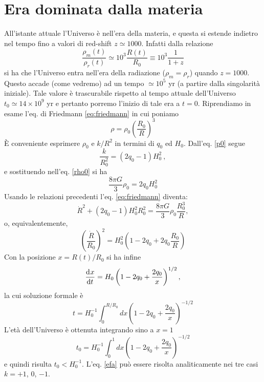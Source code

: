\section{Era dominata dalla materia}

All'istante attuale l'Universo è nell'era della materia, e questa si estende
indietro nel tempo fino a valori di red-shift $z \simeq 1000$.  Infatti dalla
relazione
\begin{equation}
  \frac {\rho_m(t)} {\rho_r(t)} \simeq  10^{3} \frac {R(t)} {R_0} \equiv  10^3
  \frac{1}{1+z}
\end{equation}
si ha che l'Universo entra nell'era della radiazione ($\rho_m = \rho_r$) quando
$z = 1000$.  Questo accade (come vedremo) ad un tempo $ \simeq 10^5$ yr (a
partire dalla singolarità iniziale).  Tale valore è trascurabile rispetto al
tempo attuale dell'Universo $t_0 \simeq 14 \times 10^9$ yr e pertanto porremo
l'inizio di tale era a $t=0$.  Riprendiamo in esame l'eq. di Friedmann
\eqref{eq:friedmann} in cui poniamo
\begin{equation}
  \rho = \rho_0 \left( \frac {R_0} {R} \right)^{3}
\end{equation}
È conveniente esprimere $\rho_0$ e $k/R^2$ in termini di $q_0$ ed $H_0$.
Dall'eq. \eqref{p0} segue
\begin{equation}
  \frac{k}{R_0^2}=(2q_0-1) H_0^2~,
\end{equation}
e sostituendo nell'eq. \eqref{rho0} si ha
\begin{equation}
  \frac{8\pi G}{3} \rho_0 = 2q_0 H_0^2
\end{equation}
Usando le relazioni precedenti l'eq. \eqref{eq:friedmann} diventa:
\begin{equation}
  \dot{R}^2 + (2 q_0-1) H_0^2 R_0^2 = \frac{8\pi G}{3} \rho_0 \frac{R_0^3}{R},
\end{equation}
o, equivalentemente,
\begin{equation}
  \left(\frac{\dot R}{R_0}\right)^2 = H_0^2 \left(1-2q_0+2 q_0
    \frac{R_0}{R}\right)
\end{equation}
Con la posizione $x=R(t)/R_0$ si ha infine
\begin{equation}
  \frac{{\mathop{}\!\mathrm{d}^{}}x}{\mathop{}\!\mathrm{d} {t}^{}}= H_0 \left(1-2q_0+ \frac {2q_0}{x}\right)^{1/2},
  \label{2.40}
\end{equation}
la cui soluzione formale è
\begin{equation}
  t= H_0^{-1} \int_0^{R/R_0} dx \left(1-2q_0+\frac{2q_0}{x}\right)^{-1/2}
  \label{efa}
\end{equation}
L'età dell'Universo è ottenuta integrando sino a $x=1$
\begin{equation}
  t_0= H_0^{-1} \int_0^{1} dx \left(1-2q_0+\frac{2q_0}{x}\right)^{-1/2}
\end{equation}
e quindi risulta $t_0< H_0^{-1}$.  L'eq. \eqref{efa} può essere risolta
analiticamente nei tre casi $k=+1$, $0$, $-1$.

